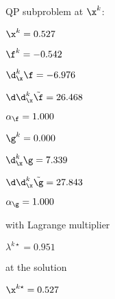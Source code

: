 QP subproblem at $\x^{k}$:

\bigskip
$\x^k=   0.527$


$\f^k =  -0.542$

$\d^k_{\x} \f =  -6.976$

$\d\d^k_{\x} \tilde \f =  26.468$

$\alpha_{\footnotesize\f} =   1.000$

\bigskip
$\g^k =   0.000$

$\d^k_{\x}\g =   7.339$

$\d\d^k_{\x} \tilde \g =  27.843$

$\alpha_{\footnotesize\g} =   1.000$

\bigskip
with Lagrange multiplier

$\lambda^{k\star} =   0.951$

at the solution

$\x^{k\star} =   0.527$

